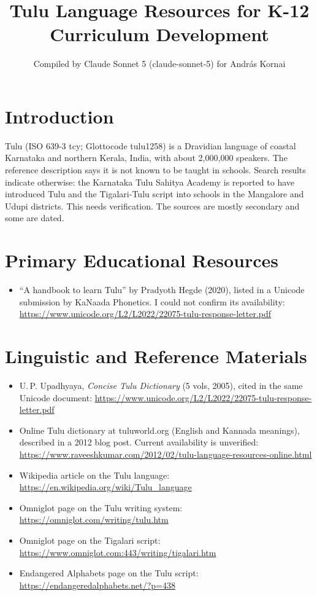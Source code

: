 \documentclass[12pt]{article}
\title{Tulu Language Resources for K-12 Curriculum Development}
\author{Compiled by Claude Sonnet 5 (claude-sonnet-5) for Andr\'as Kornai}
\date{}
\begin{document}
\maketitle

\section{Introduction}
Tulu (ISO 639-3 tcy; Glottocode tulu1258) is a Dravidian language of coastal Karnataka and northern Kerala, India, with about 2,000,000 speakers. The reference description says it is not known to be taught in schools. Search results indicate otherwise: the Karnataka Tulu Sahitya Academy is reported to have introduced Tulu and the Tigalari-Tulu script into schools in the Mangalore and Udupi districts. This needs verification. The sources are mostly secondary and some are dated.

\section{Primary Educational Resources}
\begin{itemize}
\item ``A handbook to learn Tulu'' by Pradyoth Hegde (2020), listed in a Unicode submission by KaNaada Phonetics. I could not confirm its availability: \url{https://www.unicode.org/L2/L2022/22075-tulu-response-letter.pdf}
\end{itemize}

\section{Linguistic and Reference Materials}
\begin{itemize}
\item U.\,P. Upadhyaya, \emph{Concise Tulu Dictionary} (5 vols, 2005), cited in the same Unicode document: \url{https://www.unicode.org/L2/L2022/22075-tulu-response-letter.pdf}
\item Online Tulu dictionary at tuluworld.org (English and Kannada meanings), described in a 2012 blog post. Current availability is unverified: \url{https://www.raveeshkumar.com/2012/02/tulu-language-resources-online.html}
\item Wikipedia article on the Tulu language: \url{https://en.wikipedia.org/wiki/Tulu_language}
\item Omniglot page on the Tulu writing system: \url{https://omniglot.com/writing/tulu.htm}
\item Omniglot page on the Tigalari script: \url{https://www.omniglot.com:443/writing/tigalari.htm}
\item Endangered Alphabets page on the Tulu script: \url{https://endangeredalphabets.net/?p=438}
\end{itemize}
\end{document}
